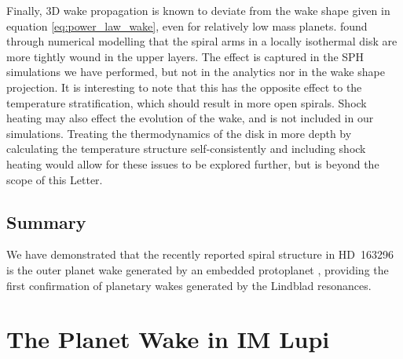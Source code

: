 Finally, 3D wake propagation is known to deviate from the wake shape given in equation \ref{eq:power_law_wake}, even for relatively low mass planets.
\citet{zhu2015} found through numerical modelling that the spiral arms in a locally isothermal disk are more tightly wound in the upper layers.
The effect is captured in the SPH simulations we have performed, but not in the analytics nor in the wake shape projection.
It is interesting to note that this has the opposite effect to the temperature stratification, which should result in more open spirals.
Shock heating may also effect the evolution of the wake, and is not included in our simulations.
Treating the thermodynamics of the disk in more depth by calculating the temperature structure self-consistently and including shock heating would allow for these issues to be explored further, but is beyond the scope of this Letter.

\subsection{Summary}

We have demonstrated that the recently reported spiral structure in HD~163296 \citep{teague2021} is the outer planet wake generated by an embedded protoplanet \citep{pinte2018a}, providing the first confirmation of planetary wakes generated by the Lindblad resonances.

\section{The Planet Wake in IM Lupi} \label{sec:IMLupiwake}